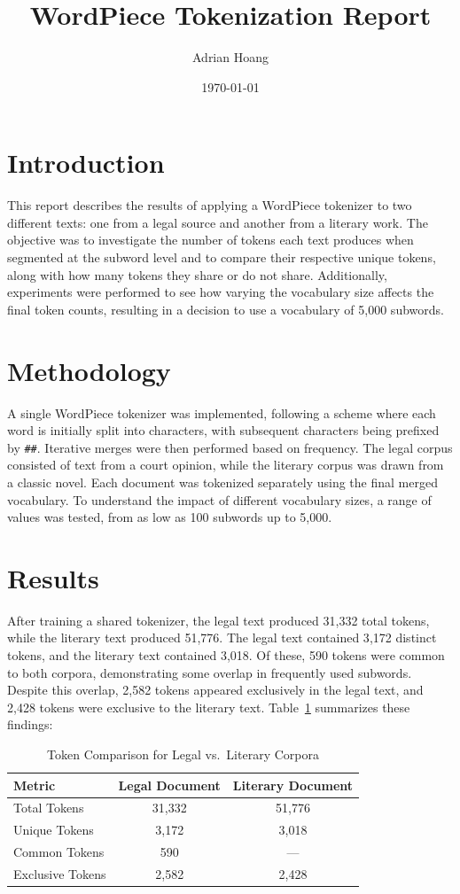 \documentclass[11pt]{article}
\title{WordPiece Tokenization Report}
\author{Adrian Hoang}
\date{\today}
\begin{document}
\maketitle

\section{Introduction}
This report describes the results of applying a WordPiece tokenizer to two different texts: one from a legal source and another from a literary work. The objective was to investigate the number of tokens each text produces when segmented at the subword level and to compare their respective unique tokens, along with how many tokens they share or do not share. Additionally, experiments were performed to see how varying the vocabulary size affects the final token counts, resulting in a decision to use a vocabulary of 5{,}000 subwords.

\section{Methodology}
A single WordPiece tokenizer was implemented, following a scheme where each word is initially split into characters, with subsequent characters being prefixed by \texttt{\#\#}. Iterative merges were then performed based on frequency. The legal corpus consisted of text from a court opinion, while the literary corpus was drawn from a classic novel. Each document was tokenized separately using the final merged vocabulary. To understand the impact of different vocabulary sizes, a range of values was tested, from as low as 100 subwords up to 5{,}000.

\section{Results}
After training a shared tokenizer, the legal text produced 31{,}332 total tokens, while the literary text produced 51{,}776. The legal text contained 3{,}172 distinct tokens, and the literary text contained 3{,}018. Of these, 590 tokens were common to both corpora, demonstrating some overlap in frequently used subwords. Despite this overlap, 2{,}582 tokens appeared exclusively in the legal text, and 2{,}428 tokens were exclusive to the literary text. Table~\ref{tab:stats} summarizes these findings:

\begin{table}[ht]
\centering
\begin{tabular}{lcc}
\toprule
\textbf{Metric} & \textbf{Legal Document} & \textbf{Literary Document} \\
\midrule
Total Tokens     & 31,332  & 51,776  \\
Unique Tokens    & 3,172   & 3,018   \\
Common Tokens    & 590     & ---     \\
Exclusive Tokens & 2,582   & 2,428   \\
\bottomrule
\end{tabular}
\caption{Token Comparison for Legal vs.\ Literary Corpora}
\label{tab:stats}
\end{table}
\end{document}
